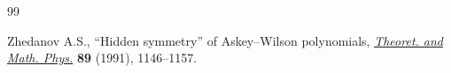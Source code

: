 \begin{thebibliography}{99}

Zhedanov A.S., ``{H}idden symmetry'' of {A}skey--{W}ilson polynomials,
 \href{https://doi.org/10.1007/BF01015906}{\textit{Theoret. and Math. Phys.}} \textbf{89} (1991), 1146--1157.

\end{thebibliography}
